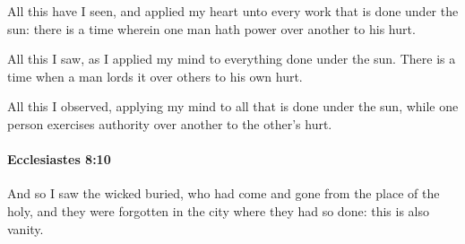 			\begin{versebox}
					\item[BHS] 
					\item[LXX] 
					\item[ASV] All this have I seen, and applied my heart unto every work that is done under the sun: there is a time wherein one man hath power over another to his hurt.
					\item[NIV] All this I saw, as I applied my mind to everything done under the sun. There is a time when a man lords it over others to his own hurt.
					\item[NRSV] All this I observed, applying my mind to all that is done under the sun, while one person exercises authority over another to the other’s hurt.
			\end{versebox}

		\paragraph{Ecclesiastes 8:10} %
			\label{ECCLESIASTES-8-10}

			And so I saw the wicked buried, who had come and gone from the place of the holy, and they were forgotten in the city where they had so done: this is also vanity.

